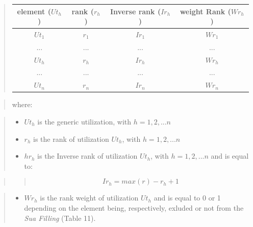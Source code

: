 \documentclass[]{article}
\providecommand{\tightlist}{%
  \setlength{\itemsep}{0pt}\setlength{\parskip}{0pt}}
\begin{document}
\begin{quote}
\begin{center}
\begin{tabular}{ c|c|c|c } 
\hline
element ($Ut_{h}$) & rank ($r_{h}$) & Inverse rank ($Ir_{h}$) & weight Rank ($Wr_{h}$)\\
\hline
$Ut_{1}$ & $r_{1}$ & $Ir_{1}$  & $Wr_{1}$\\ 
... & ... & ... & ...\\ 
$Ut_{h}$ & $r_{h}$ & $Ir_{h}$  & $Wr_{h}$\\ 
... & ... & ... & ...\\ 
$Ut_{n}$ & $r_{n}$ & $Ir_{n}$  & $Wr_{n}$\\ 
\hline
\end{tabular}
\end{center}
\end{quote}

\begin{quote}
where:
\end{quote}

\begin{quote}
\begin{itemize}
\tightlist
\item
  \(Ut_{h}\) is the generic utilization, with \(h=1,2,...n\)
\item
  \(r_{h}\) is the rank of utilization \(Ut_{h}\), with \(h=1,2,...n\)
\item
  \(hr_{h}\) is the Inverse rank of utilization \(Ut_{h}\), with
  \(h=1,2,...n\) and is equal to:
\end{itemize}
\end{quote}

\begin{quote}
\begin{quote}
\begin{equation}
\label{eq:inverseRankequation}
Ir_{h} = max(r)-r_{h}+1
\end{equation}
\end{quote}
\end{quote}

\begin{quote}
\begin{itemize}
\tightlist
\item
  \(Wr_{h}\) is the rank weight of utilization \(Ut_{h}\) and is equal
  to 0 or 1 depending on the element being, respectively, exluded or not
  from the \emph{Sua Filling} (Table 11).
\end{itemize}
\end{quote}
\end{document}
